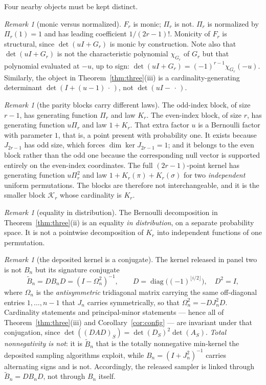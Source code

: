 \documentclass[11pt,a4paper]{article}
\theoremstyle{plain}
\theoremstyle{definition}
\theoremstyle{remark}
\newtheorem{remark}[theorem]{Remark}
\begin{document}
Four nearby objects must be kept distinct.

\begin{remark}[monic versus normalized]
$F_r$ is monic; $\Pi_r$ is not. $\Pi_r$ is normalized by $\Pi_r(1)=1$ and has
leading coefficient $1/(2r-1)!$. Monicity of $F_r$ is structural, since
$\det(uI+G_r)$ is monic by construction. Note also that $\det(uI+G_r)$ is not
the characteristic polynomial $\chi_{G_r}$ of $G_r$ but that polynomial
evaluated at $-u$, up to sign: $\det(uI+G_r)=(-1)^{r-1}\chi_{G_r}(-u)$.
Similarly, the object in Theorem~\ref{thm:three}(iii) is a
cardinality-generating determinant $\det(I+(u-1)\,\cdot\,)$, not
$\det(uI-\,\cdot\,)$.
\end{remark}

\begin{remark}[the parity blocks carry different laws]
The odd-index block, of size $r-1$, has generating function $\Pi_r$ and law
$K_r$. The even-index block, of size $r$, has generating function $u\Pi_r$ and
law $1+K_r$. That extra factor $u$ is a Bernoulli factor with parameter $1$,
that is, a point present with probability one. It exists because $J_{2r-1}$ has
odd size, which forces $\dim\ker J_{2r-1}=1$; and it belongs to the even block
rather than the odd one because the corresponding null vector is supported
entirely on the even-index coordinates. The full $(2r-1)$-point kernel has
generating function $u\Pi_r^2$ and law $1+K_r(\pi)+K_r(\sigma)$ for two
\emph{independent} uniform permutations. The blocks are therefore not
interchangeable, and it is the smaller block $\mathcal K_r$ whose cardinality is
$K_r$.
\end{remark}

\begin{remark}[equality in distribution]
The Bernoulli decomposition in Theorem~\ref{thm:three}(ii) is an equality
\emph{in distribution}, on a separate probability space. It is not a pointwise
decomposition of $K_r$ into independent functions of one permutation.
\end{remark}

\begin{remark}[the deposited kernel is a conjugate]\label{rem:conj}
The kernel released in panel two~\cite{greenpathdpp} is not $B_n$ but its
signature conjugate
\[
  \widetilde B_n=DB_nD=(I-\Omega_n^2)^{-1},
  \qquad D=\operatorname{diag}\bigl((-1)^{\lfloor i/2\rfloor}\bigr),
  \quad D^2=I,
\]
where $\Omega_n$ is the \emph{antisymmetric} tridiagonal matrix carrying the
same off-diagonal entries $1,\dots,n-1$ that $J_n$ carries symmetrically, so
that $\Omega_n^2=-DJ_n^2D$. Cardinality statements and principal-minor
statements --- hence all of Theorem~\ref{thm:three}(iii) and
Corollary~\ref{cor:config} --- are invariant under that conjugation, since
$\det((DAD)_S)=\det(D_S)^2\det(A_S)$. \emph{Total nonnegativity is not}: it is
$\widetilde B_n$ that is the totally nonnegative min-kernel the deposited
sampling algorithms exploit, while $B_n=(I+J_n^2)^{-1}$ carries alternating
signs and is not. Accordingly, the released sampler is linked through
$\widetilde B_n=DB_nD$, not through $B_n$ itself.
\end{remark}
\end{document}
